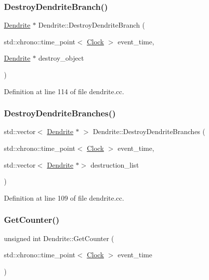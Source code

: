 \subsubsection{\texorpdfstring{Destroy\+Dendrite\+Branch()}{DestroyDendriteBranch()}}
{\footnotesize\ttfamily \mbox{\hyperlink{class_dendrite}{Dendrite}} $\ast$ Dendrite\+::\+Destroy\+Dendrite\+Branch (\begin{DoxyParamCaption}\item[{std\+::chrono\+::time\+\_\+point$<$ \mbox{\hyperlink{universe_8h_a0ef8d951d1ca5ab3cfaf7ab4c7a6fd80}{Clock}} $>$}]{event\+\_\+time,  }\item[{\mbox{\hyperlink{class_dendrite}{Dendrite}} $\ast$}]{destroy\+\_\+object }\end{DoxyParamCaption})}



Definition at line 114 of file dendrite.\+cc.

\mbox{\label{class_dendrite_a92c08afc374068922e462c9b65cf9157}} 
\subsubsection{\texorpdfstring{Destroy\+Dendrite\+Branches()}{DestroyDendriteBranches()}}
{\footnotesize\ttfamily std\+::vector$<$ \mbox{\hyperlink{class_dendrite}{Dendrite}} $\ast$ $>$ Dendrite\+::\+Destroy\+Dendrite\+Branches (\begin{DoxyParamCaption}\item[{std\+::chrono\+::time\+\_\+point$<$ \mbox{\hyperlink{universe_8h_a0ef8d951d1ca5ab3cfaf7ab4c7a6fd80}{Clock}} $>$}]{event\+\_\+time,  }\item[{std\+::vector$<$ \mbox{\hyperlink{class_dendrite}{Dendrite}} $\ast$$>$}]{destruction\+\_\+list }\end{DoxyParamCaption})}



Definition at line 109 of file dendrite.\+cc.

\mbox{\label{class_dendrite_afa65091d7bbeed3f16a3e71a687fdec3}} 
\subsubsection{\texorpdfstring{Get\+Counter()}{GetCounter()}}
{\footnotesize\ttfamily unsigned int Dendrite\+::\+Get\+Counter (\begin{DoxyParamCaption}\item[{std\+::chrono\+::time\+\_\+point$<$ \mbox{\hyperlink{universe_8h_a0ef8d951d1ca5ab3cfaf7ab4c7a6fd80}{Clock}} $>$}]{event\+\_\+time }\end{DoxyParamCaption})\hspace{0.3cm}{\ttfamily [inline]}}



